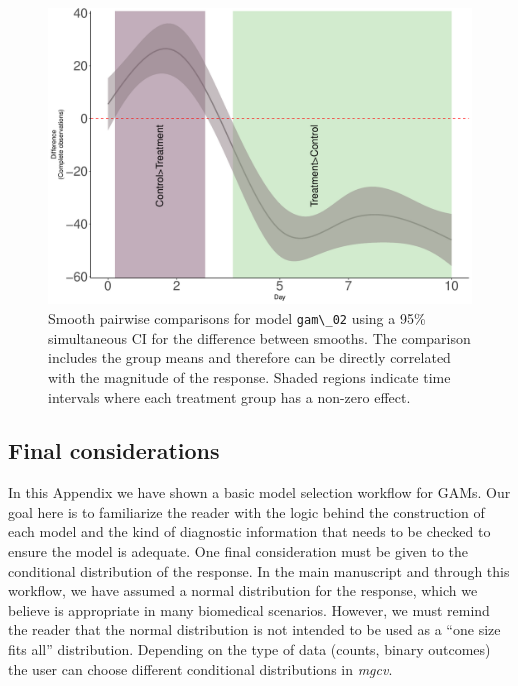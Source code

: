 \documentclass[
]{article}
\newcommand{\passthrough}[1]{#1}
\begin{document}
\begin{figure}

{\centering \includegraphics[width=0.75\linewidth]{Appendix_A_files/figure-latex/pairwise-comp-workflow-fig-1} 

}

\caption{Smooth pairwise comparisons for model \passthrough{\lstinline!gam\_02!} using a 95\% simultaneous CI for the difference between smooths. The comparison includes the group means and therefore can be directly correlated with the magnitude of the response. Shaded regions indicate time intervals where each treatment group has a non-zero effect.}\label{fig:pairwise-comp-workflow-fig}
\end{figure}
 \FloatBarrier

\hypertarget{final-considerations}{%
\subsection{Final considerations}\label{final-considerations}}

In this Appendix we have shown a basic model selection workflow for GAMs. Our goal here is to familiarize the reader with the logic behind the construction of each model and the kind of diagnostic information that needs to be checked to ensure the model is adequate. One final consideration must be given to the conditional distribution of the response. In the main manuscript and through this workflow, we have assumed a normal distribution for the response, which we believe is appropriate in many biomedical scenarios. However, we must remind the reader that the normal distribution is not intended to be used as a ``one size fits all'' distribution. Depending on the type of data (counts, binary outcomes) the user can choose different conditional distributions in \emph{mgcv}.
\end{document}

